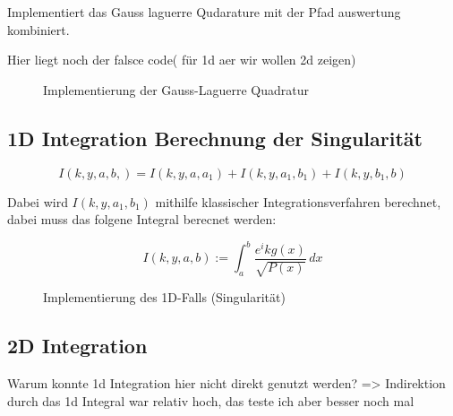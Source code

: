 Implementiert das Gauss laguerre Qudarature mit der Pfad auswertung kombiniert.

Hier liegt noch der falsce code( für 1d aer wir wollen 2d zeigen)

\begin{figure}
    
    \caption{Implementierung der Gauss-Laguerre Quadratur}
\end{figure}
\subsection{1D Integration Berechnung der Singularität}

\begin{equation}
    I(k,y,a,b,) = I(k,y,a,a_1) + I(k,y,a_1, b_1) + I(k,y,b_1,b)
\end{equation}

Dabei wird $I(k,y,a_1, b_1)$ mithilfe klassischer Integrationsverfahren berechnet, dabei muss das folgene Integral berecnet werden:

\begin{equation}
    I(k,y,a,b) := \int_{a}^{b}  \frac{e^ikg(x)}{\sqrt{P(x)}} \,dx 
\end{equation}

\begin{figure}
    
    \caption{Implementierung des 1D-Falls (Singularität)}
\end{figure}


\subsection{2D Integration}

Warum konnte 1d Integration hier nicht direkt genutzt werden?
=> Indirektion durch das 1d Integral war relativ hoch, das teste ich aber besser noch mal


